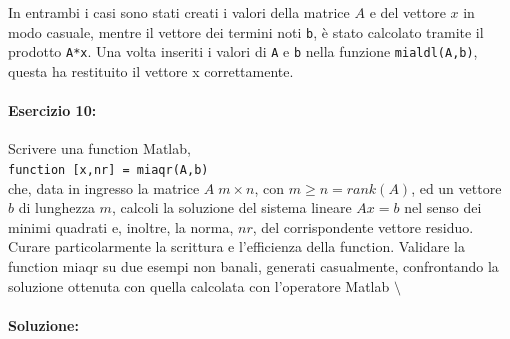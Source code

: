 \documentclass[12pt]{article}
\begin{document}
In entrambi i casi sono stati creati i valori della matrice \(A\) e del vettore \(x\) in modo casuale, mentre il vettore dei termini noti \texttt{b}, è stato calcolato tramite il prodotto
\texttt{A*x}. Una volta inseriti i valori di \texttt{A} e \texttt{b} nella funzione \texttt{mialdl(A,b)}, questa ha restituito il vettore x correttamente.

\paragraph{Esercizio 10:}Scrivere una function Matlab,\\
\texttt{function [x,nr] = miaqr(A,b)}\\
che, data in ingresso la matrice \(A\;m \times  n\), con \(m \geq n = rank(A)\), ed un vettore \(b\) di lunghezza  \(m\), calcoli la soluzione del sistema lineare \(Ax = b\) nel senso dei minimi quadrati e, inoltre, 
la norma, \(nr\), del corrispondente vettore residuo. Curare particolarmente la scrittura e l’efficienza della function. Validare la function miaqr su due esempi non banali, generati casualmente, 
confrontando la soluzione ottenuta con quella calcolata con l’operatore Matlab \(\setminus\) 
\paragraph{Soluzione:}
\end{document}

